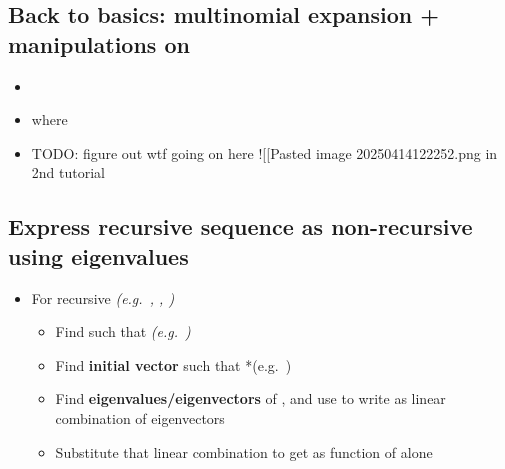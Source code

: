 \subsection*{\texorpdfstring{Back to basics: multinomial expansion +
    manipulations on
    \iMbox{\sum/\prod}}{Back to basics: multinomial expansion + manipulations on }}

\begin{itemize}

  \item
  \item
        where
  \item
        TODO: figure out wtf going on here !{[}{[}Pasted image
        20250414122252.png\textbar500{]}{]} in 2nd tutorial
\end{itemize}

\subsection*{Express recursive sequence as non-recursive using
  eigenvalues}

\begin{itemize}

  \item
        For  recursive
        \emph{(e.g.~, ,
        )}

        \begin{itemize}

          \item
                Find  such that
                \emph{(e.g.~)}
          \item
                Find \textbf{initial vector}
                 such that
                *(e.g.~)
          \item
                Find \textbf{eigenvalues/eigenvectors} of , and use
                to write  as linear combination of eigenvectors
          \item
                Substitute that linear combination to get  as
                function of  alone
        \end{itemize}
\end{itemize}